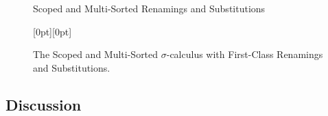 \documentclass[screen,nonacm]{acmart}
\begin{document}
\begin{figure}[h]
      \centering
      \begin{minipage}[t]{0.48\linewidth}
            \raggedright{}
            \ERen{}
      \end{minipage}
      \hfill
      \begin{minipage}[t]{0.48\linewidth}
            \raggedright{}
            \ESub{}
      \end{minipage}
      \caption{Scoped and Multi-Sorted Renamings and Substitutions}
      \label{fig:mis:ras}
\end{figure}
\begin{figure}[h]
      \centering

      \begin{minipage}[t]{0.38\linewidth}
            \raggedright{}
            \EDefLaws{}
      \end{minipage}
      \hfill
      \begin{minipage}[t]{0.58\linewidth}
            \raggedright{}
            \EMonadLaws{}
      \end{minipage}

      \vspace{1em}
      \begin{minipage}[t]{0.38\linewidth}
            \raggedright{}
            \ERewriteSys{}
      \end{minipage}
      \hfill
      \raisebox{7.75em}[0pt][0pt]{%
            \begin{minipage}[t]{0.58\linewidth}
                  \raggedright{}
                  \EInteractLaws{}
            \end{minipage}
      }
      \caption{The Scoped and Multi-Sorted $\sigma$-calculus with First-Class Renamings and Substitutions.}
      \label{fig:six-frame-layout}
\end{figure}

\subsection{}

\subsection{Discussion}\label{sec:rsn-dis}
\end{document}
